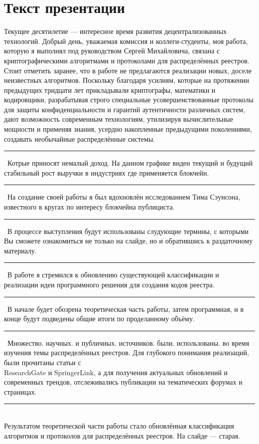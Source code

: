 \documentclass[12pt]{article}
\renewcommand{\line}{\noindent\rule{\textwidth}{1pt}}
\begin{document}
\section*{Текст презентации}
Текущее  десятилетие --- интересное время развития децентрализованных
технологий. Добрый день, уважаемая комиссия и коллеги-студенты, моя работа,
которую я выполнял под руководством Сергей Михайловича, связана с
криптографическими алгоритмами и протоколами для распределённых реестров.
Стоит отметить заранее, что в работе не предлагаются реализации новых, доселе
неизвестных алгоритмов. Поскольку благодаря усилиям,  которые  на  протяжении
предыдущих тридцати  лет  прикладывали криптографы,  математики  и кодировщики,
разрабатывая  строго  специальные усовершенствованные  протоколы для  защиты
конфиденциальности  и гарантий аутентичности  различных  систем, дают
возможность современным технологиям, утилизируя вычислительные мощности и
применяя знания, усердно накопленные предыдущими поколениями, создавать
необычайные распределённые системы.\\
\line\
Котрые приносят немалый доход. На данном графике виден текущий и будущий
стабильный рост выручки в индустриях где применяется блокчейн.\\
\line\
На создание своей работы я был вдохновлён исследованием Тима Сэунсона,
известного в кругах по интересу блокчейна публициста.\\
\line\
В процессе выступления будут использованы слудующие термины, с которыми Вы
сможете ознакомиться не только на слайде, но и обратившись к раздаточному
материалу.\\
\line\
В работе я стремился к обновлению существующей классификации и реализации идеи
программного решения для создания кодов реестра.\\
\line\
В начале будет обозрена теоретическая часть работы, затем программная, и в
конце будут подведены общие итоги по проделанному объёму.\\
\line\
Множество. научных. и публичных. источников. были. использованы. во время
изучения темы распределённых реестров. Для глубокого понимания реализаций, были
прочитаны статьи с\\ResearchGate и SpringerLink, а для получения актуальных
обновлений и современных трендов, отслеживались публикации на тематических
форумах и страницах.\\
\line\\
Результатом теоретической части работы стало обновлённая классификация
алгоритмов и протоколов для распределённых реестров. На слайде --- старая.
\end{document}

